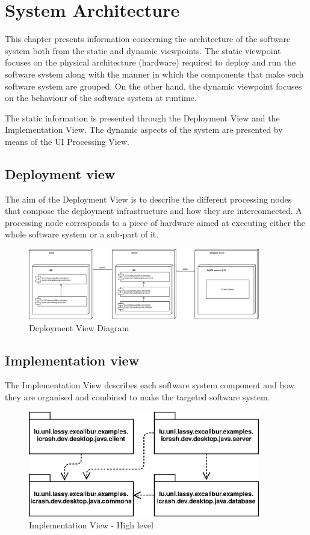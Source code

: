 \chapter{System Architecture}
\label{chap:arch}

This chapter presents information concerning the architecture of the software
system both from the static and dynamic viewpoints. The static viewpoint focuses
on the physical architecture (hardware) required to deploy and run the
software system along with the manner in which the components that make such
software system are grouped. On the other hand, the dynamic viewpoint focuses on
the behaviour of the software system at runtime. 

The static information is presented through the \gls{Deployment View} and the
\gls{Implementation View}. The dynamic aspects of the system are presented by
means of the \gls{UI Processing View}.


\section{Deployment view}
The aim of the \gls{Deployment View} is to describe the different processing nodes that compose
the deployment infrastructure and how they are interconnected. A processing node
corresponds to a piece of hardware aimed at executing either the whole software
system or a sub-part of it.

\begin{figure}[h]
	\centering
	\includegraphics[width=0.9\textwidth]{./images/architecture/deployment_view.eps}
	\caption{Deployment View Diagram}
\end{figure}


\section{Implementation view}
The \gls{Implementation View} describes each software system component and how
they are organised and combined to make the targeted software system.

\begin{figure}[h!]
	\centering
	\includegraphics[width=0.9\textwidth]{./images/architecture/implementation_view/highest_view.eps}
	\caption{Implementation View - High level}
\end{figure}

